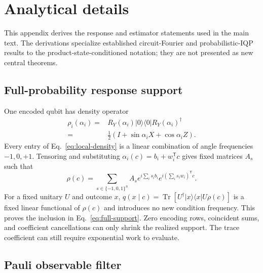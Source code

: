 \section{Analytical details}
\label{app:analysis}

This appendix derives the response and estimator statements used in the main
text.  The derivations specialize established circuit-Fourier and
probabilistic-IQP results to the product-state-conditioned notation; they are
not presented as new central theorems.

\subsection{Full-probability response support}

One encoded qubit has density operator
\begin{equation}
 \begin{split}
 \rho_i(\alpha_i)={}&R_Y(\alpha_i)|0\rangle\!\langle0|R_Y(\alpha_i)^\dagger\\
 ={}&\tfrac12\left(I+\sin\alpha_i X+\cos\alpha_i Z\right).
 \end{split}
 \label{eq:local-density}
\end{equation}
Every entry of Eq.~\eqref{eq:local-density} is a linear combination of angle
frequencies $-1,0,+1$.  Tensoring and substituting
$\alpha_i(c)=b_i+w_i^\mathsf{T}c$ gives fixed matrices $A_s$ such that
\begin{equation}
 \rho(c)=\sum_{s\in\{-1,0,1\}^n}
 A_s e^{i\sum_i s_i b_i}
 e^{i(\sum_i s_iw_i)^\mathsf{T}c}.
\end{equation}
For a fixed unitary $U$ and outcome $x$,
$q(x\mid c)=\operatorname{Tr}[U^\dagger|x\rangle\!\langle x|U\rho(c)]$
is a fixed linear functional of $\rho(c)$ and introduces no new condition
frequency.  This proves the inclusion in Eq.~\eqref{eq:full-support}.  Zero
encoding rows, coincident sums, and coefficient cancellations can only shrink
the realized support.  The trace coefficient can still require exponential
work to evaluate.

\subsection{Pauli observable filter}

